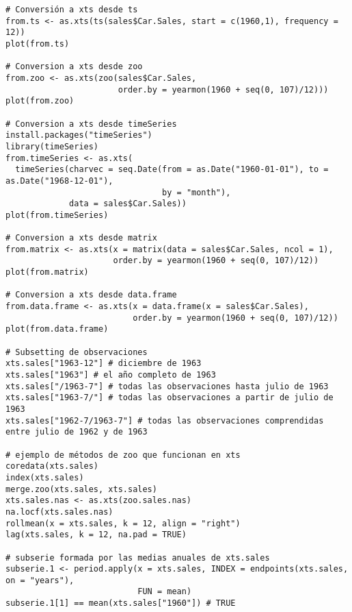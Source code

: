 \documentclass[12pt,a4paper,oneside]{article}
\begin{document}
\begin{Verbatim}[fontsize=\footnotesize]
# Conversión a xts desde ts
from.ts <- as.xts(ts(sales$Car.Sales, start = c(1960,1), frequency = 12))
plot(from.ts)

# Conversion a xts desde zoo
from.zoo <- as.xts(zoo(sales$Car.Sales,
                       order.by = yearmon(1960 + seq(0, 107)/12)))
plot(from.zoo)

# Conversion a xts desde timeSeries
install.packages("timeSeries")
library(timeSeries)
from.timeSeries <- as.xts(
  timeSeries(charvec = seq.Date(from = as.Date("1960-01-01"), to = as.Date("1968-12-01"),
                                by = "month"),
             data = sales$Car.Sales))
plot(from.timeSeries)

# Conversion a xts desde matrix
from.matrix <- as.xts(x = matrix(data = sales$Car.Sales, ncol = 1),
                      order.by = yearmon(1960 + seq(0, 107)/12))
plot(from.matrix)

# Conversion a xts desde data.frame
from.data.frame <- as.xts(x = data.frame(x = sales$Car.Sales),
                          order.by = yearmon(1960 + seq(0, 107)/12))
plot(from.data.frame)

# Subsetting de observaciones
xts.sales["1963-12"] # diciembre de 1963
xts.sales["1963"] # el año completo de 1963
xts.sales["/1963-7"] # todas las observaciones hasta julio de 1963
xts.sales["1963-7/"] # todas las observaciones a partir de julio de 1963
xts.sales["1962-7/1963-7"] # todas las observaciones comprendidas entre julio de 1962 y de 1963

# ejemplo de métodos de zoo que funcionan en xts
coredata(xts.sales)
index(xts.sales)
merge.zoo(xts.sales, xts.sales)
xts.sales.nas <- as.xts(zoo.sales.nas)
na.locf(xts.sales.nas)
rollmean(x = xts.sales, k = 12, align = "right")
lag(xts.sales, k = 12, na.pad = TRUE)

# subserie formada por las medias anuales de xts.sales
subserie.1 <- period.apply(x = xts.sales, INDEX = endpoints(xts.sales, on = "years"),
                           FUN = mean)
subserie.1[1] == mean(xts.sales["1960"]) # TRUE
\end{Verbatim} 
\end{document}
